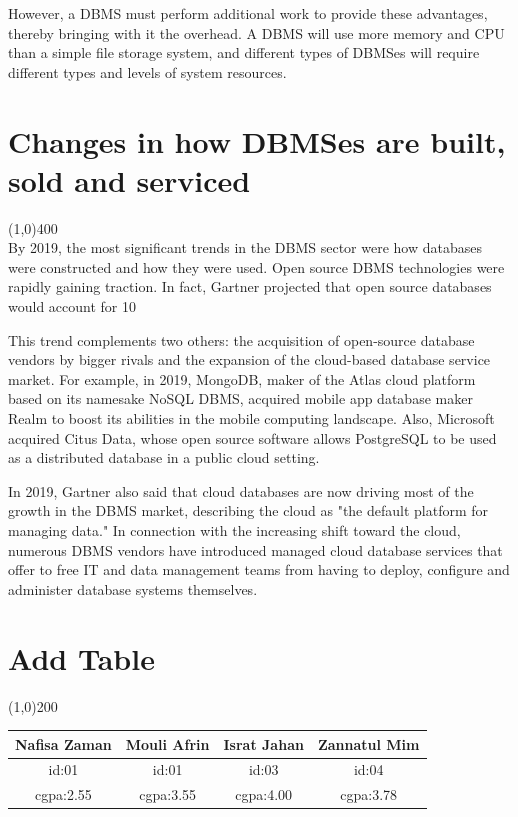 \documentclass{article}
\begin{document}
However, a DBMS must perform additional work to provide these advantages, thereby bringing with it the overhead. A DBMS will use more memory and CPU than a simple file storage system, and different types of DBMSes will require different types and levels of system resources.

\newpage
\section{Changes in how DBMSes are built, sold and serviced}
\line(1,0){400}\\
    By 2019, the most significant trends in the DBMS sector were how databases were constructed and how they were used. Open source DBMS technologies were rapidly gaining traction. In fact, Gartner projected that open source databases would account for 10%


This trend complements two others: the acquisition of open-source database vendors by bigger rivals and the expansion of the cloud-based database service market. For example, in 2019, MongoDB, maker of the Atlas cloud platform based on its namesake NoSQL DBMS, acquired mobile app database maker Realm to boost its abilities in the mobile computing landscape. Also, Microsoft acquired Citus Data, whose open source software allows PostgreSQL to be used as a distributed database in a public cloud setting.

In 2019, Gartner also said that cloud databases are now driving most of the growth in the DBMS market, describing the cloud as "the default platform for managing data." In connection with the increasing shift toward the cloud, numerous DBMS vendors have introduced managed cloud database services that offer to free IT and data management teams from having to deploy, configure and administer database systems themselves.
\newpage
 \section{Add Table}
 \line(1,0){200}\\




    \begin{tabular}{|c|c|c|c|}
    \hline
    Nafisa Zaman &Mouli Afrin &Israt Jahan &Zannatul Mim\\\hline
    id:01 &id:01 &id:03 &id:04\\\hline
    cgpa:2.55 &cgpa:3.55 &cgpa:4.00 &cgpa:3.78\\\hline
    \end{tabular}\\
  	[8 cm]
\end{document}
